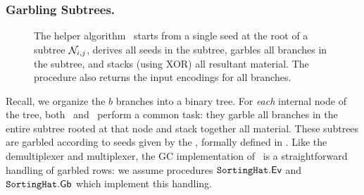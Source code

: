\subsubsection{Garbling Subtrees.}
\begin{figure}[t!]\centering{}
  \caption{%
    The helper algorithm \gbtree\ starts from a single seed
    at the root of a subtree $\mathtt{\cal N}_{i,j}$, derives all seeds in the
    subtree, garbles all branches in the subtree, and stacks (using
    XOR) all resultant material. The procedure also returns the input
    encodings for all branches.
  }\label{fig:gbtree}
\end{figure}

Recall, we organize the $b$ branches into a binary tree.
For \emph{each} internal node of the tree, both \evcond\ and \gbcond\
perform a common task: they garble all branches in the entire subtree
rooted at that node and stack together all material.
%
These subtrees are garbled according to seeds given by the
\gadget, formally defined in . Like the
demultiplexer and multiplexer, the GC implementation of \gadget\ is
a straightforward handling of garbled rows: we assume procedures
$\mathtt{SortingHat}.\textsf{Ev}$ and $\mathtt{SortingHat}.\textsf{Gb}$ which implement this handling.
%

